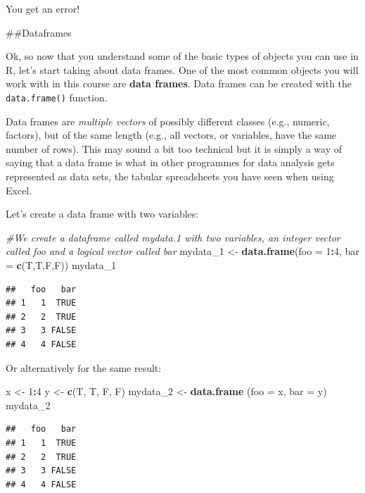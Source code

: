 \documentclass[]{book}
\newenvironment{Shaded}{\begin{snugshade}}{\end{snugshade}}
\newcommand{\CommentTok}[1]{\textcolor[rgb]{0.56,0.35,0.01}{\textit{#1}}}
\newcommand{\DataTypeTok}[1]{\textcolor[rgb]{0.13,0.29,0.53}{#1}}
\newcommand{\DecValTok}[1]{\textcolor[rgb]{0.00,0.00,0.81}{#1}}
\newcommand{\KeywordTok}[1]{\textcolor[rgb]{0.13,0.29,0.53}{\textbf{#1}}}
\newcommand{\NormalTok}[1]{#1}
\newcommand{\OperatorTok}[1]{\textcolor[rgb]{0.81,0.36,0.00}{\textbf{#1}}}
\newcommand{\StringTok}[1]{\textcolor[rgb]{0.31,0.60,0.02}{#1}}
\theoremstyle{definition}
\theoremstyle{definition}
\theoremstyle{definition}
\theoremstyle{remark}
\begin{document}
You get an error!

\#\#Dataframes

Ok, so now that you understand some of the basic types of objects you
can use in R, let's start taking about data frames. One of the most
common objects you will work with in this course are \textbf{data
frames}. Data frames can be created with the \texttt{data.frame()}
function.

Data frames are \emph{multiple vectors} of possibly different classes
(e.g., numeric, factors), but of the same length (e.g., all vectors, or
variables, have the same number of rows). This may sound a bit too
technical but it is simply a way of saying that a data frame is what in
other programmes for data analysis gets represented as data sets, the
tabular spreadsheets you have seen when using Excel.

Let's create a data frame with two variables:

\begin{Shaded}
\begin{Highlighting}[]
\CommentTok{#We create a dataframe called mydata.1 with two variables, an integer vector called foo and a logical vector called bar}
\NormalTok{mydata_}\DecValTok{1}\NormalTok{ <-}\StringTok{ }\KeywordTok{data.frame}\NormalTok{(}\DataTypeTok{foo =} \DecValTok{1}\OperatorTok{:}\DecValTok{4}\NormalTok{, }\DataTypeTok{bar =} \KeywordTok{c}\NormalTok{(T,T,F,F))}
\NormalTok{mydata_}\DecValTok{1}
\end{Highlighting}
\end{Shaded}

\begin{verbatim}
##   foo   bar
## 1   1  TRUE
## 2   2  TRUE
## 3   3 FALSE
## 4   4 FALSE
\end{verbatim}

Or alternatively for the same result:

\begin{Shaded}
\begin{Highlighting}[]
\NormalTok{x <-}\StringTok{ }\DecValTok{1}\OperatorTok{:}\DecValTok{4}
\NormalTok{y <-}\StringTok{ }\KeywordTok{c}\NormalTok{(T, T, F, F)}
\NormalTok{mydata_}\DecValTok{2}\NormalTok{ <-}\StringTok{ }\KeywordTok{data.frame}\NormalTok{ (}\DataTypeTok{foo =}\NormalTok{ x, }\DataTypeTok{bar =}\NormalTok{ y)}
\NormalTok{mydata_}\DecValTok{2}
\end{Highlighting}
\end{Shaded}

\begin{verbatim}
##   foo   bar
## 1   1  TRUE
## 2   2  TRUE
## 3   3 FALSE
## 4   4 FALSE
\end{verbatim}
\end{document}
